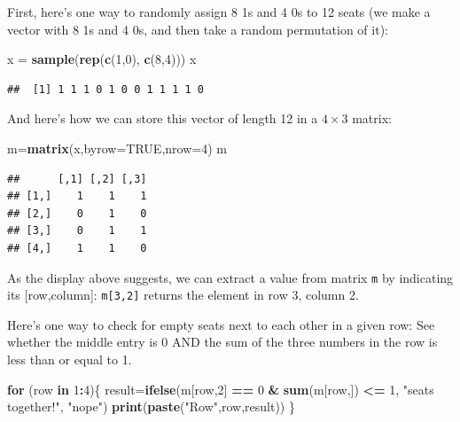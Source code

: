 \documentclass[
]{book}
\newenvironment{Shaded}{\begin{snugshade}}{\end{snugshade}}
\newcommand{\AttributeTok}[1]{\textcolor[rgb]{0.13,0.29,0.53}{#1}}
\newcommand{\ConstantTok}[1]{\textcolor[rgb]{0.56,0.35,0.01}{#1}}
\newcommand{\ControlFlowTok}[1]{\textcolor[rgb]{0.13,0.29,0.53}{\textbf{#1}}}
\newcommand{\DecValTok}[1]{\textcolor[rgb]{0.00,0.00,0.81}{#1}}
\newcommand{\FunctionTok}[1]{\textcolor[rgb]{0.13,0.29,0.53}{\textbf{#1}}}
\newcommand{\NormalTok}[1]{#1}
\newcommand{\OtherTok}[1]{\textcolor[rgb]{0.56,0.35,0.01}{#1}}
\newcommand{\SpecialCharTok}[1]{\textcolor[rgb]{0.81,0.36,0.00}{\textbf{#1}}}
\newcommand{\StringTok}[1]{\textcolor[rgb]{0.31,0.60,0.02}{#1}}
\theoremstyle{definition}
\theoremstyle{definition}
\theoremstyle{definition}
\theoremstyle{definition}
\theoremstyle{remark}
\begin{document}
First, here's one way to randomly assign 8 1s and 4 0s to 12 seats (we make a vector with 8 1s and 4 0s, and then take a random permutation of it):

\begin{Shaded}
\begin{Highlighting}[]
\NormalTok{x }\OtherTok{=} \FunctionTok{sample}\NormalTok{(}\FunctionTok{rep}\NormalTok{(}\FunctionTok{c}\NormalTok{(}\DecValTok{1}\NormalTok{,}\DecValTok{0}\NormalTok{), }\FunctionTok{c}\NormalTok{(}\DecValTok{8}\NormalTok{,}\DecValTok{4}\NormalTok{)))}
\NormalTok{x}
\end{Highlighting}
\end{Shaded}

\begin{verbatim}
##  [1] 1 1 1 0 1 0 0 1 1 1 1 0
\end{verbatim}

And here's how we can store this vector of length 12 in a \(4\times 3\) matrix:

\begin{Shaded}
\begin{Highlighting}[]
\NormalTok{m}\OtherTok{=}\FunctionTok{matrix}\NormalTok{(x,}\AttributeTok{byrow=}\ConstantTok{TRUE}\NormalTok{,}\AttributeTok{nrow=}\DecValTok{4}\NormalTok{)}
\NormalTok{m}
\end{Highlighting}
\end{Shaded}

\begin{verbatim}
##      [,1] [,2] [,3]
## [1,]    1    1    1
## [2,]    0    1    0
## [3,]    0    1    1
## [4,]    1    1    0
\end{verbatim}

As the display above suggests, we can extract a value from matrix \texttt{m} by indicating its {[}row,column{]}: \texttt{m{[}3,2{]}} returns the element in row 3, column 2.

Here's one way to check for empty seats next to each other in a given row: See whether the middle entry is 0 AND the sum of the three numbers in the row is less than or equal to 1.

\begin{Shaded}
\begin{Highlighting}[]
\ControlFlowTok{for}\NormalTok{ (row }\ControlFlowTok{in} \DecValTok{1}\SpecialCharTok{:}\DecValTok{4}\NormalTok{)\{}
\NormalTok{  result}\OtherTok{=}\FunctionTok{ifelse}\NormalTok{(m[row,}\DecValTok{2}\NormalTok{] }\SpecialCharTok{==} \DecValTok{0} \SpecialCharTok{\&} \FunctionTok{sum}\NormalTok{(m[row,]) }\SpecialCharTok{\textless{}=} \DecValTok{1}\NormalTok{,}
                \StringTok{"seats together!"}\NormalTok{,}
                \StringTok{"nope"}\NormalTok{)}
   \FunctionTok{print}\NormalTok{(}\FunctionTok{paste}\NormalTok{(}\StringTok{"Row"}\NormalTok{,row,result))}
\NormalTok{\}}
\end{Highlighting}
\end{Shaded}
\end{document}
